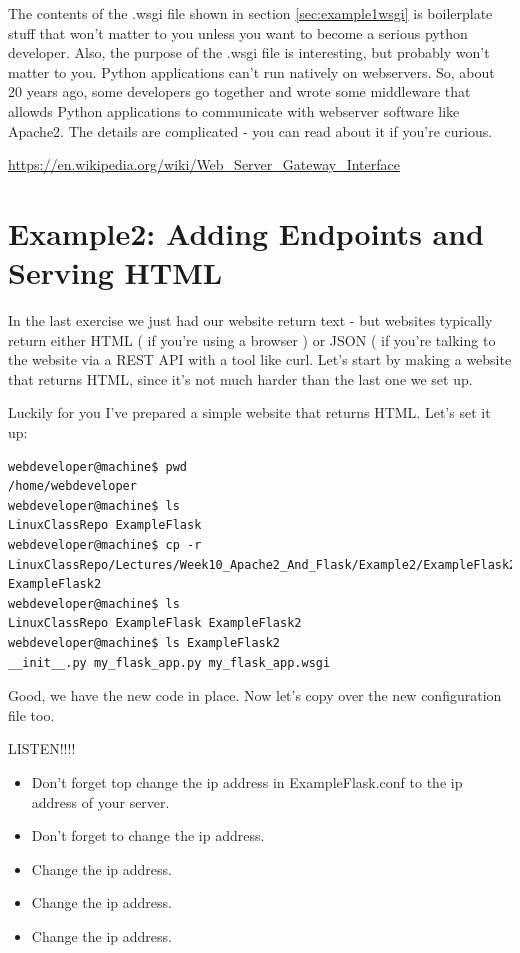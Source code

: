 \documentclass[10pt]{article}
\begin{document}
The contents of the .wsgi file shown in section \ref{sec:example1wsgi} is boilerplate stuff that won't matter to you unless you want to become a serious python developer. Also, the purpose of the .wsgi file is interesting, but probably won't matter to you. Python applications can't run natively on webservers. So, about 20 years ago, some developers go together and wrote some middleware that allowds Python applications to communicate with webserver software like Apache2. The details are complicated - you can read about it if you're curious. 

\url{https://en.wikipedia.org/wiki/Web_Server_Gateway_Interface}


\section{Example2: Adding Endpoints and Serving HTML}
In the last exercise we just had our website return text - but websites
typically return either HTML ( if you're using a browser ) or JSON ( if you're
talking to the website via a REST API with a tool like curl. Let's start by
making a website that returns HTML, since it's not much harder than the last one
we set up.

Luckily for you I've prepared a simple website that returns HTML. Let's set it
up:

\begin{lstlisting}[style=term, caption=Deploying our second website]
webdeveloper@machine$ pwd
/home/webdeveloper
webdeveloper@machine$ ls
LinuxClassRepo ExampleFlask
webdeveloper@machine$ cp -r
LinuxClassRepo/Lectures/Week10_Apache2_And_Flask/Example2/ExampleFlask2
ExampleFlask2
webdeveloper@machine$ ls
LinuxClassRepo ExampleFlask ExampleFlask2
webdeveloper@machine$ ls ExampleFlask2
__init__.py my_flask_app.py my_flask_app.wsgi
\end{lstlisting}

Good, we have the new code in place. Now let's copy over the new configuration
file too.

\pagebreak

{\LARGE LISTEN!!!!}

\begin{itemize}
\item Don't forget top change the ip address in ExampleFlask.conf to the ip
address of your server.
\item Don't forget to change the ip address.
\item Change the ip address.
\item Change the ip address.
\item Change the ip address.
\end{itemize}
\end{document}
